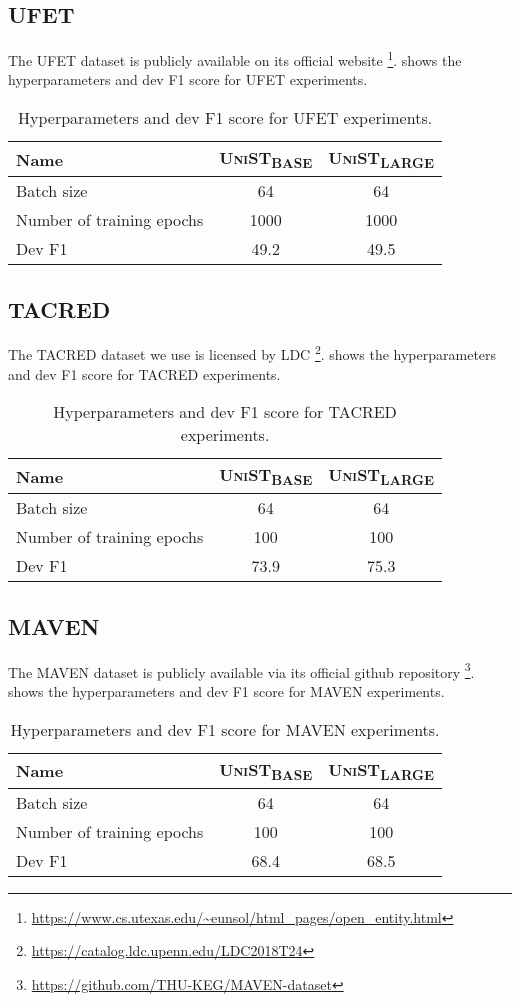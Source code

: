 \documentclass[11pt]{article}
\newcommand{\basemodel}{\textsc{UniST}\textsubscript{BASE}}
\newcommand{\largemodel}{\textsc{UniST}\textsubscript{LARGE}}
\begin{document}
\subsection{UFET}
The UFET dataset is publicly available on its official website \footnote{\url{https://www.cs.utexas.edu/~eunsol/html_pages/open_entity.html}}.  shows the hyperparameters and dev F1 score for UFET experiments.
\begin{table}[h]
    \centering
    \small
    \begin{tabular}{l|cc}
        \toprule
        Name & \basemodel & \largemodel \\
        \midrule
        Batch size & 64 & 64 \\
        Number of training epochs & 1000 & 1000 \\
        Dev F1 & 49.2 & 49.5 \\
        \bottomrule
    \end{tabular}
    \caption{Hyperparameters and dev F1 score for UFET experiments.} 
    \label{tab:ufethyp}
\end{table} 

\subsection{TACRED}
The TACRED dataset we use is licensed by LDC \footnote{\url{https://catalog.ldc.upenn.edu/LDC2018T24}}.  shows the hyperparameters and dev F1 score for TACRED experiments.
\begin{table}[h]
    \centering
    \small
    \begin{tabular}{l|cc}
        \toprule
        Name & \basemodel & \largemodel \\
        \midrule
        Batch size & 64 & 64 \\
        Number of training epochs & 100 & 100 \\
        Dev F1 & 73.9 & 75.3 \\
        \bottomrule
    \end{tabular}
    \caption{Hyperparameters and dev F1 score for TACRED experiments.} 
    \label{tab:tacredhyp}
\end{table} 
\subsection{MAVEN}
The MAVEN dataset is publicly available via its official github repository \footnote{\url{https://github.com/THU-KEG/MAVEN-dataset}}.  shows the hyperparameters and dev F1 score for MAVEN experiments.
\begin{table}[h]
    \centering
    \small
    \begin{tabular}{l|cc}
        \toprule
        Name & \basemodel & \largemodel \\
        \midrule
        Batch size & 64 & 64 \\
        Number of training epochs & 100 & 100 \\
        Dev F1 & 68.4 & 68.5 \\
        \bottomrule
    \end{tabular}
    \caption{Hyperparameters and dev F1 score for MAVEN experiments.} 
    \label{tab:mavenhyp}
\end{table} 
\end{document}
